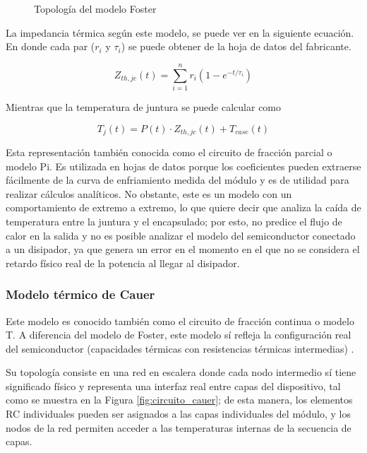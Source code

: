 \documentclass[journal]{IEEEtran}
\begin{document}
    \begin{figure}[H]
        \centering
        
        \caption{Topología del modelo Foster}
    \label{fig:circuito_foster}
    \end{figure}

    La impedancia térmica según este modelo, se puede ver en la siguiente ecuación. En donde
    cada par (\emph{$r_{i}$} y \emph{$\tau_{i}$}) se puede obtener de la hoja de datos
    del fabricante. 

    \begin{equation}
        Z_{th,jc}(t) = \sum_{i=1}^{n} r_i \left(1 - e^{-t/\tau_i} \right)
    \end{equation}

    Mientras que la temperatura de juntura se puede calcular como

    \begin{equation}
        T_j(t) = P(t) \cdot Z_{th,jc}(t) + T_{case}(t)
    \end{equation}

    Esta representación también conocida como el circuito de fracción parcial o modelo Pi. 
    Es utilizada en hojas de datos porque los coeficientes pueden extraerse fácilmente de
    la curva de enfriamiento medida del módulo y es de utilidad para realizar cálculos analíticos. 
    No obstante, este es un modelo con un comportamiento de extremo a extremo, lo que quiere decir
    que analiza la caída de temperatura entre la juntura y el encapsulado; por esto, no 
    predice el flujo de calor en la salida y no es posible analizar el modelo del 
    semiconductor conectado a un disipador, ya que genera un error en el momento en el que no 
    se considera el retardo físico real de la potencia al llegar al disipador. 



    \subsubsection{Modelo térmico de Cauer}
    Este modelo es conocido también como el circuito de fracción continua o modelo T. 
    A diferencia del modelo de Foster, este modelo sí refleja la configuración real del 
    semiconductor (capacidades térmicas con resistencias térmicas intermedias) \cite{schutze2008thermal}.

    \setlength{\parskip}{1em}

    Su topología consiste en una red en escalera donde cada nodo intermedio sí
    tiene significado físico y representa una interfaz real entre capas del dispositivo, tal como 
    se muestra en la Figura \ref{fig:circuito_cauer}; de esta manera, los elementos RC individuales 
    pueden ser asignados a las capas individuales del módulo, y los nodos de la red permiten acceder 
    a las temperaturas internas de la secuencia de capas.
\end{document}
